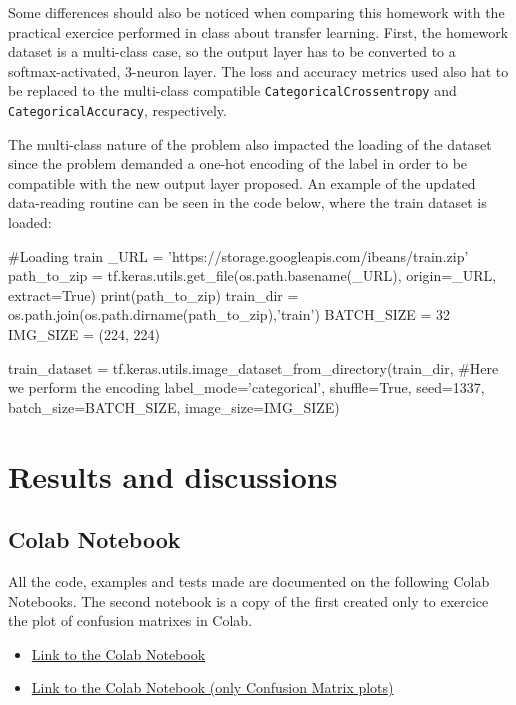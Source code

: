 \documentclass[10pt, a4paper]{article}
\begin{document}
Some differences should also be noticed when comparing this homework with the practical exercice performed in class about transfer learning. First, the homework dataset
is a multi-class case, so the output layer has to be converted to a softmax-activated, 3-neuron layer. The loss and accuracy metrics used also hat to be replaced to the 
multi-class compatible {\tt CategoricalCrossentropy} and {\tt CategoricalAccuracy}, respectively. 

The multi-class nature of the problem also impacted the loading of the dataset since the problem demanded a one-hot encoding of the label in order to be compatible with the new output layer proposed. 
An example of the updated data-reading routine can be seen in the code below, where the train dataset is loaded:

\begin{python}
#Loading train
_URL = 'https://storage.googleapis.com/ibeans/train.zip'
path_to_zip = tf.keras.utils.get_file(os.path.basename(_URL), origin=_URL, extract=True)
print(path_to_zip)
train_dir = os.path.join(os.path.dirname(path_to_zip),'train')
BATCH_SIZE = 32
IMG_SIZE = (224, 224)

train_dataset = tf.keras.utils.image_dataset_from_directory(train_dir,
                                                            #Here we perform the encoding
                                                            label_mode='categorical', 
                                                            shuffle=True,
                                                            seed=1337,
                                                            batch_size=BATCH_SIZE,
                                                            image_size=IMG_SIZE)
\end{python}

\section{Results and discussions}

\subsection{Colab Notebook}

All the code, examples and tests made are documented on the following Colab Notebooks. 
The second notebook is a copy of the first created only to exercice the plot of confusion matrixes in Colab.

\begin{itemize}
  \item \href{https://colab.research.google.com/drive/1vbsj_MysbOn23sX-VEfPNyZsClUPHzFQ?usp=sharing}{Link to the Colab Notebook}
  \item \href{https://colab.research.google.com/drive/1xBnmJjsY1vJki0OXt7i3fqnDc0oXuTGr?usp=sharing}{Link to the Colab Notebook (only Confusion Matrix plots)}
\end{itemize}
\end{document}
